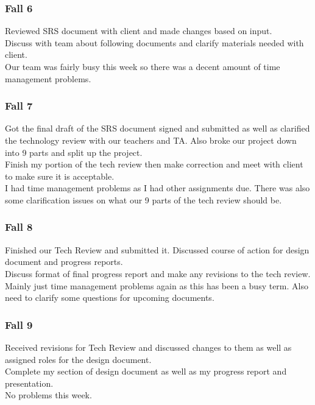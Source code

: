\subsubsection{Fall 6}
Reviewed SRS document with client and made changes based on input.\\ Discuss with team about following documents and clarify materials needed with client.\\ Our team was fairly busy this week so there was a decent amount of time management problems.\\

\subsubsection{Fall 7}
Got the final draft of the SRS document signed and submitted as well as clarified the technology review with our teachers and TA. Also broke our project down into 9 parts and split up the project.\\ Finish my portion of the tech review then make correction and meet with client to make sure it is acceptable.\\ I had time management problems as I had other assignments due. There was also some clarification issues on what our 9 parts of the tech review should be.\\

\subsubsection{Fall 8}
Finished our Tech Review and submitted it. Discussed course of action for design document and progress reports.\\ Discuss format of final progress report and make any revisions to the tech review.\\ Mainly just time management problems again as this has been a busy term. Also need to clarify some questions for upcoming documents.\\

\subsubsection{Fall 9}
Received revisions for Tech Review and discussed changes to them as well as assigned roles for the design document.\\ Complete my section of design document as well as my progress report and presentation.\\ No problems this week.\\

